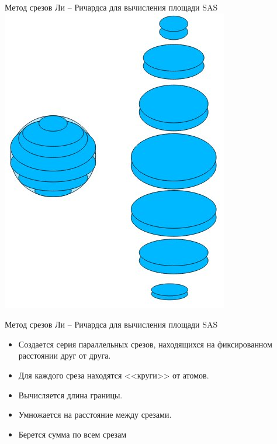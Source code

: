 \documentclass{beamer}
\begin{document}
    \begin{frame}{Метод срезов Ли -- Ричардса
        для вычисления площади SAS}
        \includegraphics[height=0.7\textheight]{lee.jpg}
    \end{frame}

    \begin{frame}{Метод срезов Ли -- Ричардса
        для вычисления площади SAS}
        \begin{itemize}
        \item Создается серия параллельных срезов,
            находящихся на фиксированном расстоянии друг от друга.
        \item Для каждого среза находятся <<круги>> от атомов.
        \item Вычисляется длина границы.
        \item Умножается на расстояние между срезами.
        \item Берется сумма по всем срезам
        \end{itemize}
    \end{frame}
\end{document}
